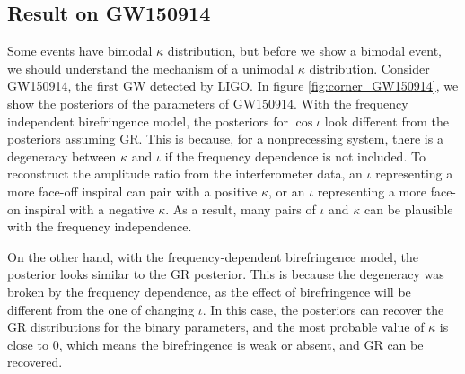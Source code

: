 \documentclass[aps,prd,twocolumn,superscriptaddress,preprintnumbers,floatfix,nofootinbib]{revtex4-2}
\begin{document}



\subsection{Result on GW150914}
Some events have bimodal $\kappa$ distribution, but before we show a bimodal event, we should understand the mechanism of a unimodal $\kappa$ distribution.
Consider GW150914, the first GW detected by LIGO.
In figure \ref{fig:corner_GW150914}, we show the posteriors of the parameters of GW150914.
With the frequency independent birefringence model, the posteriors for $\cos\iota$ look different from the posteriors assuming GR.
This is because, for a nonprecessing system, there is a degeneracy between $\kappa$ and $\iota$ if the frequency dependence is not included.
To reconstruct the amplitude ratio from the interferometer data, an $\iota$ representing a more face-off inspiral can pair with a positive $\kappa$, or an $\iota$ representing a more face-on inspiral with a negative $\kappa$.
As a result, many pairs of $\iota$ and $\kappa$ can be plausible with the frequency independence.

On the other hand, with the frequency-dependent birefringence model, the posterior looks similar to the GR posterior.
This is because the degeneracy was broken by the frequency dependence, as the effect of birefringence will be different from the one of changing $\iota$.
In this case, the posteriors can recover the GR distributions for the binary parameters,
and the most probable value of $\kappa$ is close to $0$, which means the birefringence is weak or absent, and GR can be recovered.

\end{document}
